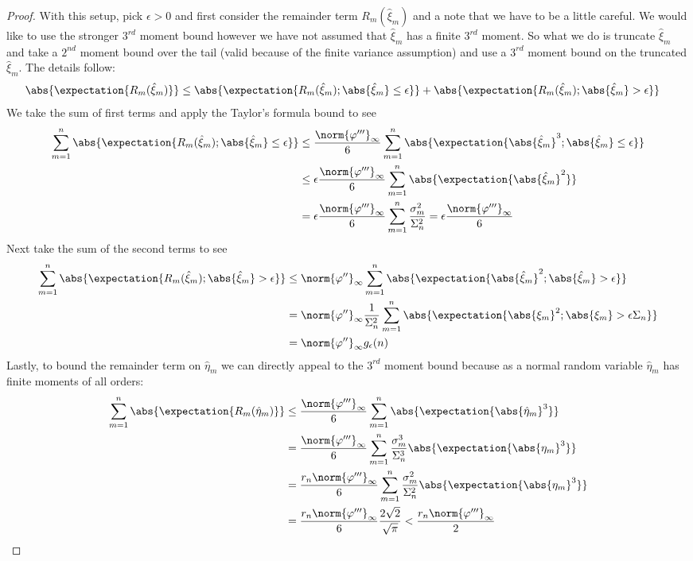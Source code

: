 \begin{proof}
With this setup, pick $\epsilon >0$ and first consider the remainder term $R_m(\hat{\xi}_m) $
and a note that we have to be a little careful.  We would like to use
the stronger $3^{rd}$ moment bound however we have not
assumed that $\hat{\xi}_m$ has a finite $3^{rd}$ moment.  So what we
do is truncate $\hat{\xi}_m$ and take a $2^{nd}$ moment bound over the
tail (valid because of the finite variance assumption) and use a
$3^{rd}$ moment bound on the truncated $\hat{\xi}_m$.  The details follow:
\begin{align*}
\abs{\expectation{R_m(\hat{\xi}_m) }} &\leq
\abs{\expectation{R_m(\hat{\xi}_m) ; \abs{\hat{\xi}_m} \leq \epsilon}}
+ \abs{\expectation{R_m(\hat{\xi}_m) ; \abs{\hat{\xi}_m} > \epsilon}}
\end{align*}
We take the sum of first terms and apply the Taylor's formula bound to see 
\begin{align*}
\sum_{m=1}^n \abs{\expectation{R_m(\hat{\xi}_m) ; \abs{\hat{\xi}_m} \leq
    \epsilon}}
&\leq
\frac{\norm{\varphi^{\prime\prime\prime}}_\infty}{6} \sum_{m=1}^n \abs{\expectation{\abs{\hat{\xi}_m}^3
    ; \abs{\hat{\xi}_m} \leq \epsilon}} \\
&\leq
\epsilon \frac{\norm{\varphi^{\prime\prime\prime}}_\infty}{6} \sum_{m=1}^n
\abs{\expectation{\abs{\hat{\xi}_m}^2}} \\
&=
\epsilon \frac{\norm{\varphi^{\prime\prime\prime}}_\infty}{6} \sum_{m=1}^n
\frac{\sigma_m^2}{\Sigma_n^2} = \epsilon \frac{\norm{\varphi^{\prime\prime\prime}}_\infty}{6} \\
\end{align*}
Next take the sum of the second terms to see
\begin{align*}
\sum_{m=1}^n \abs{\expectation{R_m(\hat{\xi}_m) ; \abs{\hat{\xi}_m} >
    \epsilon}}
&\leq
\norm{\varphi^{\prime\prime}}_\infty\sum_{m=1}^n \abs{\expectation{\abs{\hat{\xi}_m}^2
    ; \abs{\hat{\xi}_m} > \epsilon}} \\
&=
\norm{\varphi^{\prime\prime}}_\infty \frac{1}{\Sigma_n^2}\sum_{m=1}^n \abs{\expectation{\abs{\xi_m}^2
    ; \abs{\xi_m} > \epsilon \Sigma_n}} \\
&= \norm{\varphi^{\prime\prime}}_\infty g_\epsilon(n)
\end{align*}
Lastly, to bound the remainder term on $\hat{\eta}_m$ we can directly
appeal to the $3^{rd}$ moment bound because as a normal random
variable $\hat{\eta}_m$ has finite moments of all orders:
\begin{align*}
\sum_{m=1}^n \abs{\expectation{R_m(\hat{\eta}_m) }}
&\leq
\frac{\norm{\varphi^{\prime\prime\prime}}_\infty}{6} \sum_{m=1}^n
\abs{\expectation{\abs{\hat{\eta}_m}^3}} \\
&= \frac{\norm{\varphi^{\prime\prime\prime}}_\infty}{6} \sum_{m=1}^n \frac{\sigma_m^3}{\Sigma_n^3}
\abs{\expectation{\abs{\eta_m}^3}} \\
&= \frac{r_n \norm{\varphi^{\prime\prime\prime}}_\infty}{6} \sum_{m=1}^n \frac{\sigma_m^2}{\Sigma_n^2}
\abs{\expectation{\abs{\eta_m}^3}} \\
&= \frac{r_n \norm{\varphi^{\prime\prime\prime}}_\infty}{6}
\frac{2\sqrt{2}}{\sqrt{\pi}} < \frac{r_n \norm{\varphi^{\prime\prime\prime}}_\infty}{2}
\end{align*}


\end{proof}
